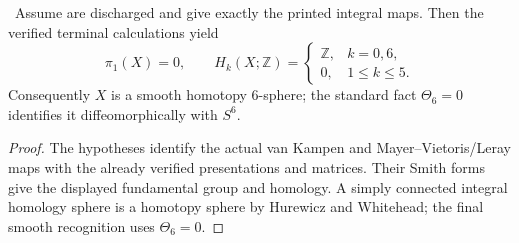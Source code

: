 \begin{theorem}
\Conditional\ Assume  are discharged and give exactly the printed integral maps. Then the verified terminal calculations yield
\[
\pi_1(X)=0,\qquad H_k(X;\mathbb Z)=
\begin{cases}
\mathbb Z,&k=0,6,\\
0,&1\le k\le5.
\end{cases}
\]
Consequently $X$ is a smooth homotopy $6$-sphere; the standard fact $\Theta_6=0$ identifies it diffeomorphically with $S^6$.
\end{theorem}

\begin{proof}
The hypotheses identify the actual van Kampen and Mayer--Vietoris/Leray maps with the already verified presentations and matrices. Their Smith forms give the displayed fundamental group and homology. A simply connected integral homology sphere is a homotopy sphere by Hurewicz and Whitehead; the final smooth recognition uses $\Theta_6=0$.
\end{proof}
